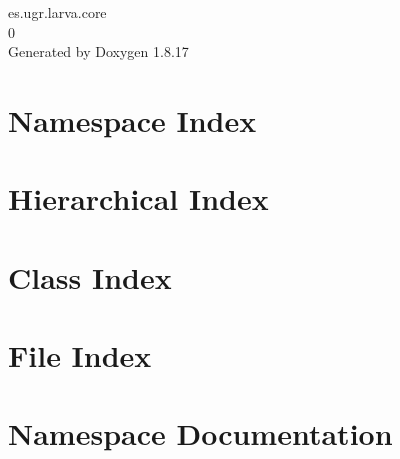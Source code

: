 \let\mypdfximage\pdfximage\def\pdfximage{\immediate\mypdfximage}\documentclass[twoside]{book}
\newcommand{\+}{\discretionary{\mbox{\scriptsize$\hookleftarrow$}}{}{}}
\newcommand{\clearemptydoublepage}{%
  \newpage{\pagestyle{empty}\cleardoublepage}%
}
\begin{document}
\hypersetup{pageanchor=false,
             bookmarksnumbered=true,
             pdfencoding=unicode
            }
\begin{titlepage}
\vspace*{7cm}
\begin{center}%
{\Large es.\+ugr.\+larva.\+core \\[1ex]\large 0 }\\
\vspace*{1cm}
{\large Generated by Doxygen 1.8.17}\\
\end{center}
\end{titlepage}
\clearemptydoublepage
{}
\tableofcontents
\clearemptydoublepage
{}
\hypersetup{pageanchor=true}

\chapter{Namespace Index}

\chapter{Hierarchical Index}

\chapter{Class Index}

\chapter{File Index}

\chapter{Namespace Documentation}

\end{document}
